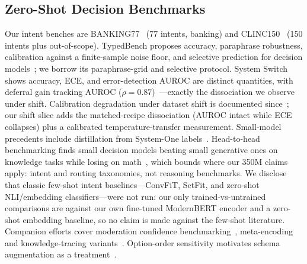 \subsection{Zero-Shot Decision Benchmarks}
Our intent benches are BANKING77~\cite{casanueva2020banking77} (77 intents,
banking) and CLINC150~\cite{larson2019clinc150} (150 intents plus
out-of-scope). TypedBench proposes accuracy, paraphrase robustness, calibration against a
finite-sample noise floor, and selective prediction for decision
models~\cite{typedbench2026}; we borrow its paraphrase-grid and selective
protocol. System Switch shows accuracy, ECE, and error-detection AUROC are
distinct quantities, with deferral gain tracking AUROC
($\rho=0.87$)~\cite{systemswitch2026}---exactly the dissociation we observe
under shift. Calibration degradation under dataset shift is documented
since~\cite{ovadia2019trust}; our shift slice adds the matched-recipe
dissociation (AUROC intact while ECE collapses) plus a calibrated
temperature-transfer measurement. Small-model precedents include distillation from System-One
labels~\cite{distilljev2026}. Head-to-head benchmarking finds small decision
models beating small generative ones on knowledge tasks while losing on
math~\cite{jevbench2026}, which bounds where our 350M claims apply: intent
and routing taxonomies, not reasoning benchmarks. We disclose that classic
few-shot intent baselines---ConvFiT, SetFit, and zero-shot NLI/embedding
classifiers---were not run: our only trained-vs-untrained comparisons are
against our own fine-tuned ModernBERT encoder and a zero-shot embedding
baseline, so no claim is made against the few-shot literature. Companion efforts cover
moderation confidence benchmarking~\cite{modbench2026}, meta-encoding and
knowledge-tracing variants~\cite{metaenc2026,jevkt2026}. Option-order sensitivity
motivates schema augmentation as a treatment~\cite{pezeshkpour2024option}.
